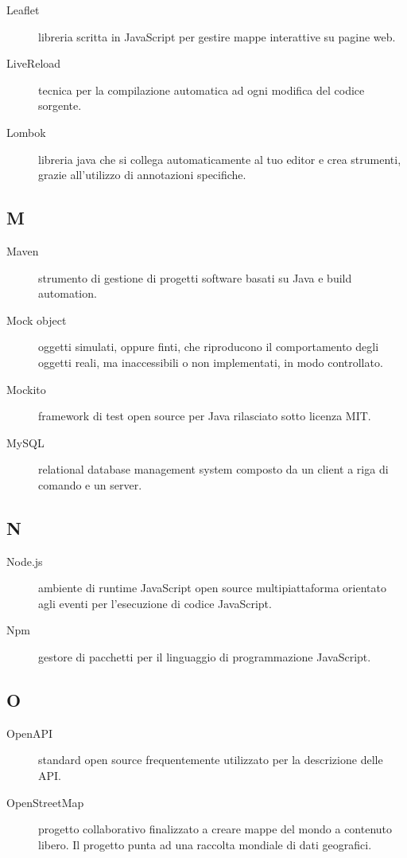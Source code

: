 \documentclass[../../../manuale.sviluppatore.tex]{subfiles}
\begin{document}
\begin{description}
    \item[Leaflet] libreria scritta in JavaScript per gestire mappe interattive su pagine web.
    \item[LiveReload] tecnica per la compilazione automatica ad ogni modifica del codice sorgente.
    \item[Lombok] libreria java che si collega automaticamente al tuo editor e crea strumenti, grazie all'utilizzo di annotazioni specifiche.
\end{description}

\subsection{M}

\begin{description}
    \item[Maven] strumento di gestione di progetti software basati su Java e build automation.
    \item[Mock object] oggetti simulati, oppure finti, che riproducono il comportamento degli oggetti reali, ma inaccessibili o non implementati, in modo controllato.
    \item[Mockito] framework di test open source per Java rilasciato sotto licenza MIT\@.
    \item[MySQL] relational database management system composto da un client a riga di comando e un server.
\end{description}

\subsection{N}

\begin{description}
  \item[Node.js] ambiente di runtime JavaScript open source multipiattaforma orientato agli eventi per l'esecuzione di codice JavaScript.
  \item[Npm] gestore di pacchetti per il linguaggio di programmazione JavaScript.
\end{description}

\subsection{O}

\begin{description}
    \item[OpenAPI] standard open source frequentemente utilizzato per la descrizione delle API\@.
    \item[OpenStreetMap] progetto collaborativo finalizzato a creare mappe del mondo a contenuto libero. Il progetto punta ad una raccolta mondiale di dati geografici.
\end{description}
\end{document}
